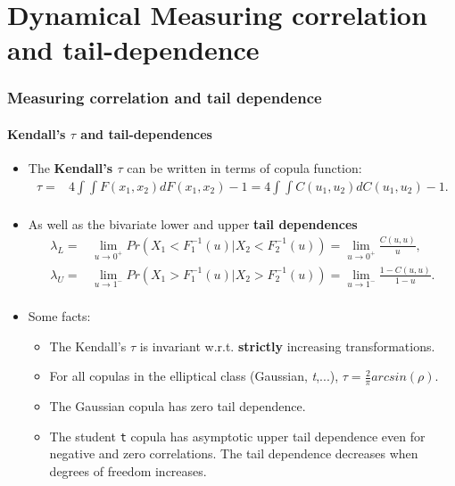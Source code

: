 \documentclass{beamer}
\begin{document}
\section{Dynamical Measuring correlation and tail-dependence}
\begin{frame}
  \frametitle{Measuring correlation and tail dependence}
  \framesubtitle{Kendall's $\tau$ and tail-dependences}
  \begin{itemize}
  \item The \textbf{Kendall's $\tau$} can be written in terms of copula function:
    \begin{equation*}
      \begin{split}
        \tau = & 4 \int \int F(x_1, x_2)dF(x_1,x_2)-1 = 4 \int \int C(u_1, u_2)dC(u_1,u_2)-1. \\
      \end{split}
    \end{equation*}

  \item As well as the bivariate lower and upper \textbf{tail dependences}
    \begin{equation*}
      \begin{split}
        \lambda_L = & \lim \limits_{u \to 0^{+}} Pr(X_1< F_1^{-1}(u)| X_2<F_2^{-1}(u))= \lim \limits_{u \to 0^{+}} \frac{C(u,u)}{u},\\
        \lambda_U=&\lim \limits_{u \to 1^{-}} Pr(X_1> F_1^{-1}(u)|
        X_2>F_2^{-1}(u))= \lim \limits_{u \to 1^{-}} \frac{1-C(u,u)}{1-u}.\\
      \end{split}
    \end{equation*}

  \item Some facts:
    \begin{itemize}
    \item The Kendall's $\tau$ is invariant w.r.t. \textbf{strictly} increasing transformations.
    \item For all copulas in the elliptical class (Gaussian, \emph{t},...),
      $\tau = \frac{2}{\pi}arcsin(\rho)$.
    \item The Gaussian copula has zero tail dependence.
    \item The  student \texttt{t} copula has asymptotic upper tail dependence even for negative
      and zero correlations. The tail dependence decreases when degrees of
      freedom increases.
    \end{itemize}
  \end{itemize}
\end{frame}
\end{document}
